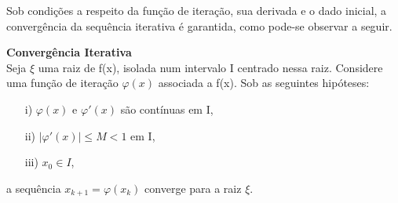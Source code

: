 Sob condições a respeito da função de iteração, sua derivada e o dado inicial, a convergência da sequência iterativa é garantida, como pode-se observar a seguir.
\begin{teo} \textbf{Convergência Iterativa} \\
    Seja $\xi$ uma raiz de f(x), isolada num intervalo I centrado nessa raiz. Considere uma função de iteração $\varphi(x)$ associada a f(x). Sob as seguintes hipóteses:
    \begin{itemize}\label{teoMPF}
        \item[i)] $\varphi(x)$ e $\varphi'(x)$ são contínuas em I,
        \item [ii)] $|\varphi'(x)| \leq M < 1$ em I,
        \item [iii)] $x_0 \in I$,
    \end{itemize}
    a sequência $x_{k+1} = \varphi(x_k)$ converge para a raiz $\xi$. 
\end{teo}
